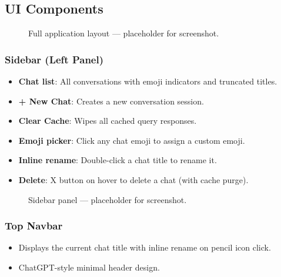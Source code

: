 \documentclass[12pt, a4paper]{article}
\begin{document}
\subsection{UI Components}

\begin{figure}[H]
\centering
{}
\caption{Full application layout — placeholder for screenshot.}
\label{fig:ui-full}
\end{figure}

\subsubsection{Sidebar (Left Panel)}
\begin{itemize}[itemsep=2pt]
  \item \textbf{Chat list}: All conversations with emoji indicators and truncated titles.
  \item \textbf{+ New Chat}: Creates a new conversation session.
  \item \textbf{Clear Cache}: Wipes all cached query responses.
  \item \textbf{Emoji picker}: Click any chat emoji to assign a custom emoji.
  \item \textbf{Inline rename}: Double-click a chat title to rename it.
  \item \textbf{Delete}: X button on hover to delete a chat (with cache purge).
\end{itemize}

\begin{figure}[H]
\centering
{}
\caption{Sidebar panel — placeholder for screenshot.}
\label{fig:ui-sidebar}
\end{figure}

\subsubsection{Top Navbar}
\begin{itemize}[itemsep=2pt]
  \item Displays the current chat title with inline rename on pencil icon click.
  \item ChatGPT-style minimal header design.
\end{itemize}
\end{document}

